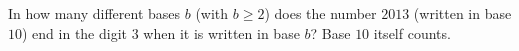 In how many different bases $b$ (with $b\ge 2$) does the number $2013$ (written in base $10$) end in the digit $3$ when it is written in base $b$? Base $10$ itself counts.
